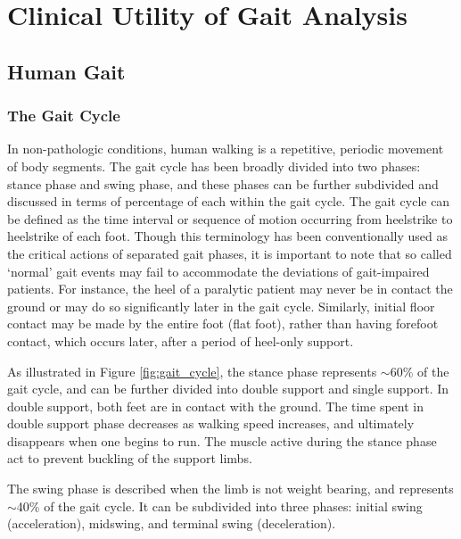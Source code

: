 \documentclass[11pt, oneside]{report}
\begin{document}
\chapter{Clinical Utility of Gait Analysis}

\section{Human Gait}

\subsection{The Gait Cycle}

In non-pathologic conditions, human walking is a repetitive, periodic movement of body segments. The gait cycle has been broadly divided into two phases: stance phase and swing phase, and these phases can be further subdivided and discussed in terms of percentage of each within the gait cycle\cite{Tao2012}. The gait cycle can be defined as the time interval or sequence of motion occurring from heelstrike to heelstrike of each foot. Though this terminology has been conventionally used as the critical actions of separated gait phases, it is important to note that so called `normal' gait events may fail to accommodate the deviations of gait-impaired patients\cite{Tao2012}. For instance, the heel of a paralytic patient may never be in contact the ground or may do so significantly later in the gait cycle. Similarly, initial floor contact may be made by the entire foot (flat foot), rather than having forefoot contact, which occurs later, after a period of heel-only support\cite{Tao2012}.

As illustrated in Figure \ref{fig:gait_cycle}, the stance phase represents $\sim$60\% of the gait cycle, and can be further divided into double support and single support. In double support, both feet are in contact with the ground. The time spent in double support phase decreases as walking speed increases, and ultimately disappears when one begins to run. The muscle active during the stance phase act to prevent buckling of the support limbs.

The swing phase is described when the limb is not weight bearing, and represents $\sim$40\% of the gait cycle. It can be subdivided into three phases: initial swing (acceleration), midswing, and terminal swing (deceleration). 
\end{document}
